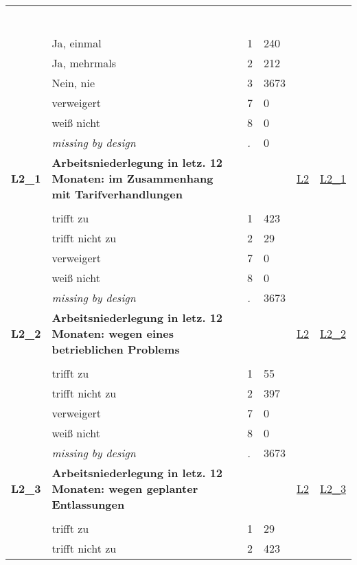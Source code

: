 \begin{longtable}{| L{2.45cm} | L{6cm} | C{1.5cm} | R{1cm} | C{2.25cm} | C{2.25cm} |}
   & \protect\subsection[Variablen L1 bis N6a\_1]{} &  &  &  &  \\ 
   & Ja, einmal & 1 & 240 &  &  \\ 
   & Ja, mehrmals & 2 & 212 &  &  \\ 
   & Nein, nie & 3 & 3673 &  &  \\ 
   & verweigert & 7 & 0 &  &  \\ 
   & weiß nicht & 8 & 0 &  &  \\ 
   & \textit{missing by design} & \textit{.} & 0 &  &  \\ 
   \midrule
\textbf{L2\_1}\label{var:L2:1} & \textbf{Arbeitsniederlegung in letz. 12 Monaten: im Zusammenhang mit Tarifverhandlungen} &  &  & \hyperref[L2]{L2} & \hyperref[var:suf:L2:1]{L2\_1} \\ 
   &  &  &  &  &  \\ 
   & trifft zu & 1 & 423 &  &  \\ 
   & trifft nicht zu & 2 & 29 &  &  \\ 
   & verweigert & 7 & 0 &  &  \\ 
   & weiß nicht & 8 & 0 &  &  \\ 
   & \textit{missing by design} & \textit{.} & 3673 &  &  \\ 
   \midrule
\textbf{L2\_2}\label{var:L2:2} & \textbf{Arbeitsniederlegung in letz. 12 Monaten: wegen eines betrieblichen Problems} &  &  & \hyperref[L2]{L2} & \hyperref[var:suf:L2:2]{L2\_2} \\ 
   &  &  &  &  &  \\ 
   & trifft zu & 1 & 55 &  &  \\ 
   & trifft nicht zu & 2 & 397 &  &  \\ 
   & verweigert & 7 & 0 &  &  \\ 
   & weiß nicht & 8 & 0 &  &  \\ 
   & \textit{missing by design} & \textit{.} & 3673 &  &  \\ 
   \midrule
\textbf{L2\_3}\label{var:L2:3} & \textbf{Arbeitsniederlegung in letz. 12 Monaten: wegen geplanter Entlassungen} &  &  & \hyperref[L2]{L2} & \hyperref[var:suf:L2:3]{L2\_3} \\ 
   &  &  &  &  &  \\ 
   & trifft zu & 1 & 29 &  &  \\ 
   & trifft nicht zu & 2 & 423 &  &  \\ 

\end{longtable}
